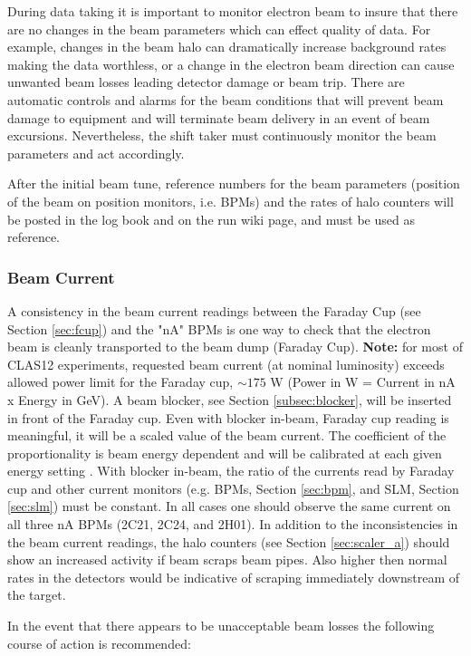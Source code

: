 \documentclass[12pt]{article}
\begin{document}
During data taking it is important to monitor electron beam
to insure that there are no changes in the beam parameters which can effect quality of data. For
example, changes in the beam halo can dramatically increase background rates
making the data worthless, or a change in the electron beam direction can cause
unwanted beam losses leading detector damage or beam trip. There are
automatic controls and alarms for the beam conditions that will prevent beam damage to equipment 
and will terminate beam delivery in an event of beam excursions. Nevertheless,  the shift taker must
continuously monitor the beam parameters and act accordingly.

After the initial beam tune, reference numbers for the beam parameters (position of the beam on position monitors, i.e. BPMs) and the rates of halo counters will be posted in the log book and on the run wiki page, and must be used as reference. 

\subsubsection{Beam Current}
\indent

A consistency in the beam current readings between the Faraday Cup (see Section \ref{sec:fcup}) and the "nA" BPMs is one way
to check that the electron beam is cleanly transported to the beam dump (Faraday Cup). {\bf Note:} for most of CLAS12 experiments, requested beam current (at nominal luminosity) exceeds allowed power limit for the Faraday cup, $\sim 175$ W (Power in W = Current in nA x Energy in GeV). A beam blocker, see Section \ref{subsec:blocker}, will be inserted in front of the Faraday cup. Even with blocker in-beam, Faraday cup reading is meaningful, it will be a scaled value of the beam current. The coefficient of the proportionality is beam energy dependent \cite{blocker} and will be calibrated at each given energy setting \cite{2018-003}. With blocker in-beam, the ratio of the currents read by Faraday cup and other current monitors (e.g. BPMs, Section \ref{sec:bpm}, and SLM, Section \ref{sec:slm}) must be constant. In all cases one should observe the same current on all three nA BPMs (2C21, 2C24, and 2H01). In addition to the inconsistencies in the beam current readings, the halo counters (see Section \ref{sec:scaler_a}) should
show an increased activity if beam scraps beam pipes. Also higher then normal rates in the detectors would be indicative
of scraping immediately downstream of the target.

In the event that there appears to be unacceptable beam losses the following course of action is recommended:
\end{document}
